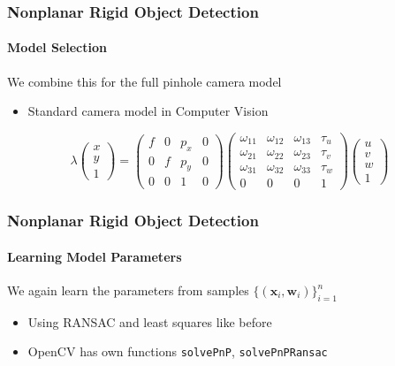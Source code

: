\documentclass[xetex,professionalfont]{beamer}
\renewcommand{\vec}[1]{\ensuremath{\mathbf{#1}}}
\newcommand{\vw}{\vec{w}}
\newcommand{\vx}{\vec{x}}
\begin{document}
\begin{frame}[label={pinhole-cam-model}]
\frametitle{Nonplanar Rigid Object Detection}
\framesubtitle{Model Selection}

We combine this for the full pinhole camera model
\begin{itemize}
    \item Standard camera model in Computer Vision
\end{itemize}
\vspace{1.5em}
\[
\lambda
\begin{pmatrix}
    x \\ y \\ 1
\end{pmatrix} =
\begin{pmatrix}
    f & 0 & p_x & 0 \\ 0 & f & p_y & 0 \\ 0 & 0 & 1 & 0
\end{pmatrix}
    \begin{pmatrix}
        \omega_{11} & \omega_{12} & \omega_{13} & \tau_u \\
        \omega_{21} & \omega_{22} & \omega_{23} & \tau_v \\
        \omega_{31} & \omega_{32} & \omega_{33} & \tau_w \\
        0 & 0 & 0 & 1
    \end{pmatrix}
\begin{pmatrix}
    u \\ v \\ w \\ 1
\end{pmatrix}
\]

\end{frame}


\begin{frame}
\frametitle{Nonplanar Rigid Object Detection}
\framesubtitle{Learning Model Parameters}

We again learn the parameters from samples $\{(\vx_i,\vw_i)\}_{i=1}^n$
\begin{itemize}
    \item Using RANSAC and least squares like before
    \item OpenCV has own functions \texttt{solvePnP}, \texttt{solvePnPRansac}
\end{itemize}

\end{frame}
\end{document}
